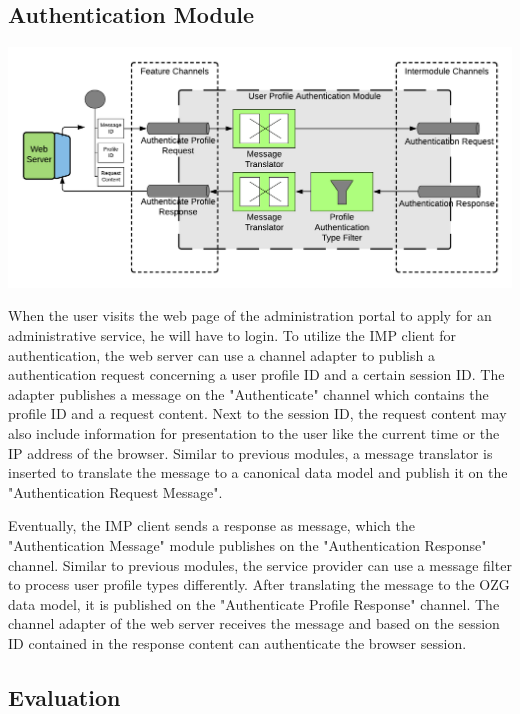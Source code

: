 \subsection{Authentication Module}

\begin{center}
    \includegraphics[scale=0.6]{Diagrams/Integration Architecture 1/Technological Integration/17. Authentication.pdf}
\end{center}

When the user visits the web page of the administration portal to apply for an administrative service, he will have to login. To utilize the IMP client for authentication, the web server can use a channel adapter to publish a authentication request concerning a user profile ID and a certain session ID. The adapter publishes a message on the "Authenticate" channel which contains the profile ID and a request content. Next to the session ID, the request content may also include information for presentation to the user like the current time or the IP address of the browser. Similar to previous modules, a message translator is inserted to translate the message to a canonical data model and publish it on the "Authentication Request Message".

Eventually, the IMP client sends a response as message, which the "Authentication Message" module publishes on the "Authentication Response" channel. Similar to previous modules, the service provider can use a message filter to process user profile types differently. After translating the message to the OZG data model, it is published on the "Authenticate Profile Response" channel. The channel adapter of the web server receives the message and based on the session ID contained in the response content can authenticate the browser session.

\subsection{Evaluation}

